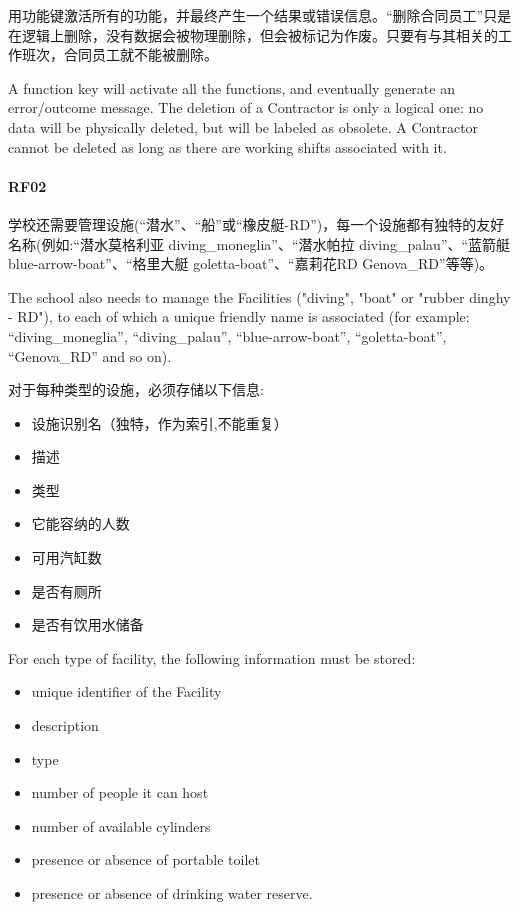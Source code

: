 用功能键激活所有的功能，并最终产生一个结果或错误信息。``删除合同员工''只是在逻辑上删除，没有数据会被物理删除，但会被标记为作废。只要有与其相关的工作班次，合同员工就不能被删除。

A function key will activate all the functions, and eventually generate
an error/outcome message. The deletion of a Contractor is only a logical
one: no data will be physically deleted, but will be labeled as
obsolete. A Contractor cannot be deleted as long as there are working
shifts associated with it.

\hypertarget{rf02}{%
\paragraph{RF02}\label{rf02}}

学校还需要管理设施(``潜水''、``船''或``橡皮艇-RD'')，每一个设施都有独特的友好名称(例如:``潜水莫格利亚
diving\_moneglia''、``潜水帕拉 diving\_palau''、``蓝箭艇
blue-arrow-boat''、``格里大艇 goletta-boat''、``嘉莉花RD
Genova\_RD''等等)。

The school also needs to manage the Facilities ("diving", "boat" or
"rubber dinghy - RD"), to each of which a unique friendly name is
associated (for example: ``diving\_moneglia'', ``diving\_palau'',
``blue-arrow-boat'', ``goletta-boat'', ``Genova\_RD'' and so on).

对于每种类型的设施，必须存储以下信息:

\begin{itemize}
\tightlist
\item
  设施识别名（独特，作为索引,不能重复）
\item
  描述
\item
  类型
\item
  它能容纳的人数
\item
  可用汽缸数
\item
  是否有厕所
\item
  是否有饮用水储备
\end{itemize}

For each type of facility, the following information must be stored:

\begin{itemize}
\tightlist
\item
  unique identifier of the Facility
\item
  description
\item
  type
\item
  number of people it can host
\item
  number of available cylinders
\item
  presence or absence of portable toilet
\item
  presence or absence of drinking water reserve.
\end{itemize}

